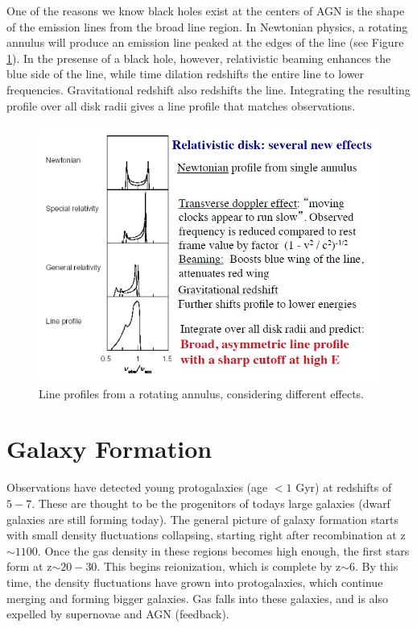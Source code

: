 One of the reasons we know black holes exist at the centers of AGN is 
the shape of the emission lines from the broad line region.  In Newtonian 
physics, a rotating annulus will produce an emission line peaked at the edges 
of the line (see Figure \ref{fig:line}).  In the presense of a black hole, 
however, relativistic beaming 
enhances the blue side of the line, while time dilation redshifts the 
entire line to lower frequencies.  Gravitational redshift also redshifts the 
line.  Integrating the resulting profile over all disk radii gives a line 
profile that matches observations.  

\begin{figure}[!h]
\begin{center}
\includegraphics[width=\textwidth]{line.jpg}
\end{center}
\caption{Line profiles from a rotating annulus, considering different effects.  
\label{fig:line}}
\end{figure}

\section{Galaxy Formation}
Observations have detected young protogalaxies (age $<1$ Gyr) at redshifts 
of $5-7$.  These are thought to be the progenitors of todays 
large galaxies (dwarf galaxies are still forming today).  The general picture 
of galaxy formation starts with small density fluctuations collapsing, starting 
right after recombination at z$\sim1100$.  Once the gas density in these 
regions becomes high enough, the first stars form at z$\sim20-30$.  
This begins reionization, which is complete by z$\sim6$.  By this time, 
the density fluctuations have grown into protogalaxies, which continue merging 
and forming bigger galaxies.  Gas falls into these galaxies, and is 
also expelled by supernovae and AGN (feedback).  

